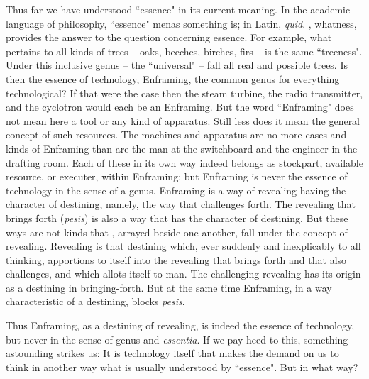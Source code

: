Thus far we have understood ``essence" in its current meaning. In the academic language of philosophy, ``essence" menas  something is; in Latin, \textit{quid}. , whatness, provides the answer to the question concerning essence. For example, what pertains to all kinds of trees -- oaks, beeches, birches, firs -- is the same ``treeness". Under this inclusive genus -- the ``universal" -- fall all real and possible trees. Is then the essence of technology, Enframing, the common genus for everything technological? If that were the case then the steam turbine, the radio transmitter, and the cyclotron would each be an Enframing. But the word ``Enframing" does not mean here a tool or any kind of apparatus. Still less does it mean the general concept of such resources. The machines and apparatus are no more cases and kinds of Enframing than are the man at the switchboard and the engineer in the drafting room. Each of these in its own way indeed belongs as stockpart, available resource, or executer, within Enframing; but Enframing is never the essence of technology in the sense of a genus. Enframing is a way of revealing having the character of destining, namely, the way that challenges forth. The revealing that brings forth (\textit{pesis}) is also a way that has the character of destining. But these ways are not kinds that , arrayed beside one another, fall under the concept of revealing. Revealing is that destining which, ever suddenly and inexplicably to all thinking, apportions to itself into the revealing that brings forth and that also challenges, and which allots itself to man. The challenging revealing has its origin as a destining in bringing-forth. But at the same time Enframing, in a way characteristic of a destining, blocks \textit{pesis}.

Thus Enframing, as a destining of revealing, is indeed the essence of technology, but never in the sense of genus and \textit{essentia}. If we pay heed to this, something astounding strikes us: It is technology itself that makes the demand on us to think in another way what is usually understood by ``essence". But in what way?

